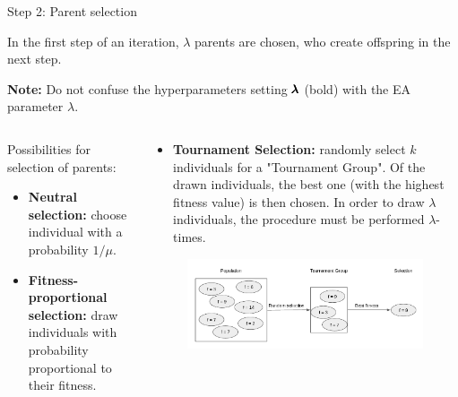 \begin{frame}{Step 2: Parent selection}


In the first step of an iteration, $\lambda$ parents are chosen, who create offspring in the next step. 

\begin{footnotesize}
    \textbf{Note:} Do not confuse the hyperparameters setting $\pmb{\lambda}$ (bold) with the EA parameter $\lambda$.    
\end{footnotesize}

\begin{columns}
\begin{column}{0.5\textwidth}
  
  Possibilities for selection of parents:

  \begin{itemize}
    \item \textbf{Neutral selection: }choose individual with a probability $1/\mu$.
    \item \textbf{Fitness-proportional selection: }draw individuals with probability proportional to their fitness.
  \end{itemize}
\end{column}%
\begin{column}{0.5\textwidth}
  \begin{itemize}
    \item \textbf{Tournament Selection: }randomly select $k$ individuals for a "Tournament Group". Of the drawn individuals, the best one (with the highest fitness value) is then chosen. In order to draw $\lambda$ individuals, the procedure must be performed $\lambda$-times.
  \end{itemize}

  \begin{figure}
    \includegraphics[width = \linewidth]{images/tournament_selection.png}
  \end{figure}

\end{column}
\end{columns}


\end{frame}
